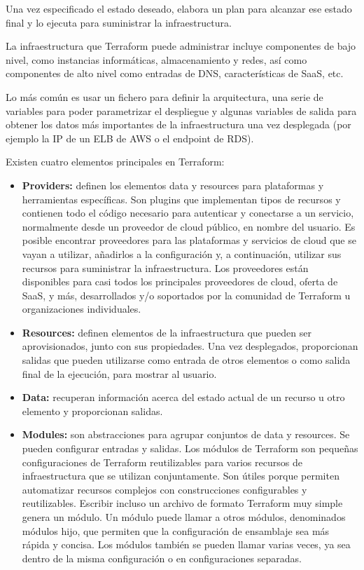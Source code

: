	Una vez especificado el estado deseado, elabora un plan para alcanzar ese estado final y lo ejecuta para suministrar la infraestructura.

	La infraestructura que Terraform puede administrar incluye componentes de bajo nivel, como instancias informáticas, almacenamiento y redes, así como componentes de alto nivel como entradas de DNS, características de SaaS, etc.

	Lo más común es usar un fichero para definir la arquitectura, una serie de variables para poder parametrizar el despliegue y algunas variables de salida para obtener los datos más importantes de la infraestructura una vez desplegada (por ejemplo la IP de un ELB de AWS o el endpoint de RDS).

	Existen cuatro elementos principales en Terraform:
	
	\begin{itemize}
		\item \textbf{Providers:} definen los elementos data y resources para plataformas y herramientas específicas. Son plugins que implementan tipos de recursos y contienen todo el código necesario para autenticar y conectarse a un servicio, normalmente desde un proveedor de cloud público, en nombre del usuario. Es posible encontrar proveedores para las plataformas y servicios de cloud que se vayan a utilizar, añadirlos a la configuración y, a continuación, utilizar sus recursos para suministrar la infraestructura. Los proveedores están disponibles para casi todos los principales proveedores de cloud, oferta de SaaS, y más, desarrollados y/o soportados por la comunidad de Terraform u organizaciones individuales.
		\item \textbf{Resources:} definen elementos de la infraestructura que pueden ser aprovisionados, junto con sus propiedades. Una vez desplegados, proporcionan salidas que pueden utilizarse como entrada de otros elementos o como salida final de la ejecución, para mostrar al usuario.
		\item \textbf{Data:} recuperan información acerca del estado actual de un recurso u otro elemento y proporcionan salidas.
		\item \textbf{Modules:} son abstracciones para agrupar conjuntos de data y resources. Se pueden configurar entradas y salidas. Los módulos de Terraform son pequeñas configuraciones de Terraform reutilizables para varios recursos de infraestructura que se utilizan conjuntamente. Son útiles porque permiten automatizar recursos complejos con construcciones configurables y reutilizables. Escribir incluso un archivo de formato Terraform muy simple genera un módulo. Un módulo puede llamar a otros módulos, denominados módulos hijo, que permiten que la configuración de ensamblaje sea más rápida y concisa. Los módulos también se pueden llamar varias veces, ya sea dentro de la misma configuración o en configuraciones separadas.
	\end{itemize}
	\clearpage

